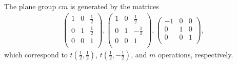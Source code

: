 The plane group $cm$ is generated by the matrices
\begin{align*}
  \left(
    \begin{array}{cc|c}
        1 & 0 & \frac{1}{2} \\
        0 & 1 & \frac{1}{2}\\
        \hline
        0 & 0 & 1 \\
    \end{array}
  \right),
  \left(
    \begin{array}{cc|c}
        1 & 0 & \frac{1}{2} \\
        0 & 1 & -\frac{1}{2}\\
        \hline
        0 & 0 & 1 \\
    \end{array}
  \right),
  \left(
    \begin{array}{cc|c}
        -1 & 0 & 0 \\
        0  & 1 & 0 \\
        \hline
        0 & 0 & 1 \\
    \end{array}
  \right),
\end{align*}
which correspond to $t(\frac{1}{2}, \frac{1}{2})$, $t(\frac{1}{2}, -\frac{1}{2})$, and $m$ operations, respectively.


